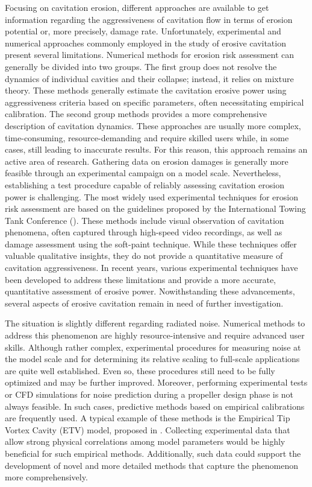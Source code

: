 Focusing on cavitation erosion, different approaches are available to get information regarding the aggressiveness of cavitation flow in terms of erosion potential or, more precisely, damage rate. Unfortunately, experimental and numerical approaches commonly employed in the study of erosive cavitation present several limitations.
Numerical methods for erosion risk assessment can generally be divided into two groups. The first group does not resolve the dynamics of individual cavities and their collapse; instead, it relies on mixture theory. These methods generally estimate the cavitation erosive power using aggressiveness criteria based on specific parameters, often necessitating empirical calibration.
The second group methods provides a more comprehensive description of cavitation dynamics. These approaches are usually more complex, time-consuming, resource-demanding and require skilled users while, in some cases, still leading to inaccurate results. For this reason, this approach remains an active area of research.
Gathering data on erosion damages is generally more feasible through an experimental campaign on a model scale. Nevertheless, establishing a test procedure capable of reliably assessing cavitation erosion power is challenging. The most widely used experimental techniques for erosion risk assessment are based on the guidelines proposed by the International Towing Tank Conference (\cite{ITTC_Erosion}).
These methods include visual observation of cavitation phenomena, often captured through high-speed video recordings, as well as damage assessment using the soft-paint technique. While these techniques offer valuable qualitative insights, they do not provide a quantitative measure of cavitation aggressiveness.
In recent years, various experimental techniques have been developed to address these limitations and provide a more accurate, quantitative assessment of erosive power. Nowithstanding these advancements, several aspects of erosive cavitation remain in need of further investigation.

The situation is slightly different regarding radiated noise. Numerical methods to address this phenomenon are highly resource-intensive and require advanced user skills. 
Although rather complex, experimental procedures for measuring noise at the model scale and for determining its relative scaling to full-scale applications are quite well established. Even so, these procedures still need to be fully optimized and may be further improved. 
Moreover, performing experimental tests or CFD simulations for noise prediction during a propeller design phase is not always feasible. In such cases, predictive methods based on empirical calibrations are frequently used. A typical example of these methods is the Empirical Tip Vortex Cavity (ETV) model, proposed in \cite{ETV_JMSE}.
Collecting experimental data that allow strong physical correlations among model parameters would be highly beneficial for such empirical methods. Additionally, such data could support the development of novel and more detailed methods that capture the phenomenon more comprehensively.

